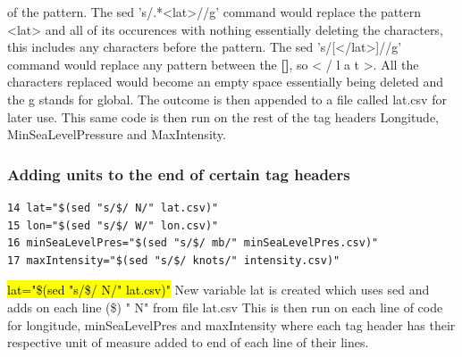 \documentclass[]{article}
\begin{document}
\begin{tcolorbox}
of the pattern. The sed 's/.*<lat>//g' command would replace the pattern <lat> and all of its\newline
occurences with nothing essentially deleting the characters, this includes any characters\newline
before the pattern. The sed 's/[</lat>]//g' command would replace any pattern between the \textbf{[]},\newline
so < / l a t >. All the characters replaced would become an empty space essentially being\newline
deleted and the g stands for global. The outcome is then appended to a file called lat.csv\newline
for later use. This same code is then run on the rest of the tag headers Longitude,\newline
MinSeaLevelPressure and MaxIntensity.\newline
\end{tcolorbox}

\subsubsection{Adding units to the end of certain tag headers}
\begin{tcolorbox}[colback=white, colframe=black, boxrule=1pt,
    title=Adding units to the end of certain tag headers, width=6.7in, fonttitle=\bfseries, listing only, listing options={language=sh, basicstyle=\ttfamily}]
\begin{verbatim}
14 lat="$(sed "s/$/ N/" lat.csv)"
15 lon="$(sed "s/$/ W/" lon.csv)"
16 minSeaLevelPres="$(sed "s/$/ mb/" minSeaLevelPres.csv)"
17 maxIntensity="$(sed "s/$/ knots/" intensity.csv)"
\end{verbatim}
\hl{lat="\$(sed "s/\$/ N/" lat.csv)"}\newline
New variable lat is created which uses sed and adds on each line (\$) " N" from file lat.csv\newline
This is then run on each line of code for longitude, minSeaLevelPres and maxIntensity where each tag
header has their respective unit of measure added to end of each line of their lines.\newline
\end{tcolorbox}
\end{document}
